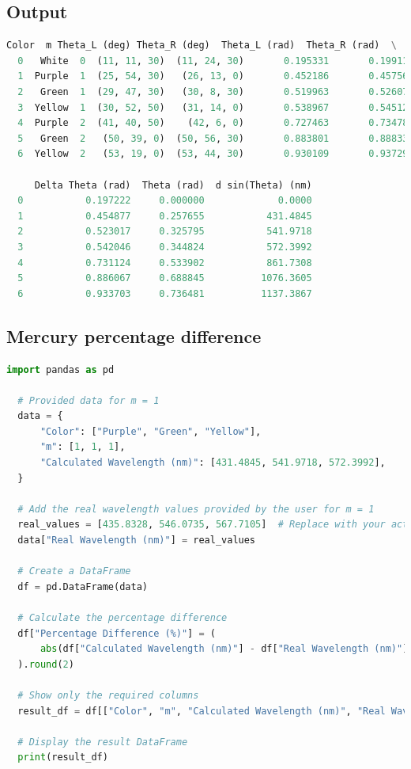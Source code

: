 \documentclass[a4paper,11pt]{article}
\begin{document}
\subsection*{Output}
\begin{lstlisting}[language=Python]
  Color  m Theta_L (deg) Theta_R (deg)  Theta_L (rad)  Theta_R (rad)  \
  0   White  0  (11, 11, 30)  (11, 24, 30)       0.195331       0.199113   
  1  Purple  1  (25, 54, 30)   (26, 13, 0)       0.452186       0.457567   
  2   Green  1  (29, 47, 30)   (30, 8, 30)       0.519963       0.526071   
  3  Yellow  1  (30, 52, 50)   (31, 14, 0)       0.538967       0.545125   
  4  Purple  2  (41, 40, 50)    (42, 6, 0)       0.727463       0.734784   
  5   Green  2   (50, 39, 0)  (50, 56, 30)       0.883801       0.888333   
  6  Yellow  2   (53, 19, 0)  (53, 44, 30)       0.930109       0.937297   
  
     Delta Theta (rad)  Theta (rad)  d sin(Theta) (nm)  
  0           0.197222     0.000000             0.0000  
  1           0.454877     0.257655           431.4845  
  2           0.523017     0.325795           541.9718  
  3           0.542046     0.344824           572.3992  
  4           0.731124     0.533902           861.7308  
  5           0.886067     0.688845          1076.3605  
  6           0.933703     0.736481          1137.3867
\end{lstlisting}

\newpage
%
\subsection*{Mercury percentage difference}
\begin{lstlisting}[language=Python]
  import pandas as pd

  # Provided data for m = 1
  data = {
      "Color": ["Purple", "Green", "Yellow"],
      "m": [1, 1, 1],
      "Calculated Wavelength (nm)": [431.4845, 541.9718, 572.3992],
  }
  
  # Add the real wavelength values provided by the user for m = 1
  real_values = [435.8328, 546.0735, 567.7105]  # Replace with your actual values
  data["Real Wavelength (nm)"] = real_values
  
  # Create a DataFrame
  df = pd.DataFrame(data)
  
  # Calculate the percentage difference
  df["Percentage Difference (%)"] = (
      abs(df["Calculated Wavelength (nm)"] - df["Real Wavelength (nm)"]) / df["Real Wavelength (nm)"] * 100
  ).round(2)
  
  # Show only the required columns
  result_df = df[["Color", "m", "Calculated Wavelength (nm)", "Real Wavelength (nm)", "Percentage Difference (%)"]]
  
  # Display the result DataFrame
  print(result_df)
  
\end{lstlisting}
\newpage
\end{document}
